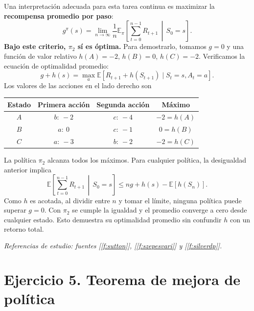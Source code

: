 \documentclass[11pt,a4paper]{article}
\newcommand{\E}{\mathbb{E}}
\begin{document}
Una interpretación adecuada para esta tarea continua es maximizar la \textbf{recompensa promedio por paso}:
\[
g^\pi(s)=\lim_{n\to\infty}\frac1n\E_\pi\left[\sum_{t=0}^{n-1}R_{t+1}\,\middle|\,S_0=s\right].
\]
\textbf{Bajo este criterio, $\pi_2$ sí es óptima.} Para demostrarlo, tomamos $g=0$ y una función de valor relativo $h(A)=-2$, $h(B)=0$, $h(C)=-2$. Verificamos la ecuación de optimalidad promedio:
\[
g+h(s)=\max_a\E[R_{t+1}+h(S_{t+1})\mid S_t=s,A_t=a].
\]
Los valores de las acciones en el lado derecho son
\begin{center}
\begin{tabular}{cccc}
\toprule
Estado & Primera acción & Segunda acción & Máximo\\
\midrule
$A$ & $b:\ -2$ & $c:\ -4$ & $-2=h(A)$\\
$B$ & $a:\ 0$ & $c:\ -1$ & $0=h(B)$\\
$C$ & $a:\ -3$ & $b:\ -2$ & $-2=h(C)$\\
\bottomrule
\end{tabular}
\end{center}
La política $\pi_2$ alcanza todos los máximos. Para cualquier política, la desigualdad anterior implica
\[
\E\left[\sum_{t=0}^{n-1}R_{t+1}\,\middle|\,S_0=s\right]
\leq ng+h(s)-\E[h(S_n)].
\]
Como $h$ es acotada, al dividir entre $n$ y tomar el límite, ninguna política puede superar $g=0$. Con $\pi_2$ se cumple la igualdad y el promedio converge a cero desde cualquier estado. Esto demuestra su optimalidad promedio sin confundir $h$ con un retorno total.

\textit{Referencias de estudio: fuentes [\ref{f:sutton}], [\ref{f:szepesvari}] y [\ref{f:silverdp}].}

\section{Ejercicio 5. Teorema de mejora de política}
\end{document}
